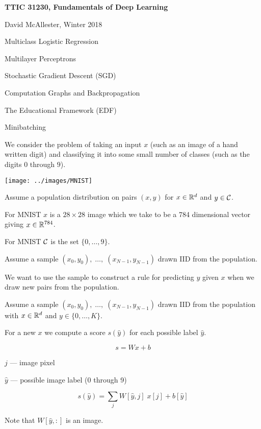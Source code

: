 {\Huge
  
  \centerline{\bf TTIC 31230, Fundamentals of Deep Learning}
  \bigskip
  \centerline{David McAllester, Winter 2018}
  \vfill
  \vfill
  \centerline{Multiclass Logistic Regression}
  \vfill
  \centerline{Multilayer Perceptrons}
  \vfill
  \centerline{Stochastic Gradient Descent (SGD)}
  \vfill
  \centerline{Computation Graphs and Backpropagation}
  \vfill
  \centerline{The Educational Framework (EDF)}
  \vfill
  \centerline{Minibatching}
  \vfill
  \vfill
  \vfill


We consider the problem of taking an input $x$ (such as an image of a hand written digit) and classifying it into some small number of classes (such as the digits $0$ through $9$).

\vfill
\centerline{\texttt{[image: ../images/MNIST]}}
  

Assume a population distribution on pairs $(x,y)$ for $x \in \mathbb{R}^d$ and $y \in {\cal C}$.

\vfill
For MNIST $x$ is a $28 \times 28$ image which we take to be a 784 dimensional vector giving $x \in \mathbb{R}^{784}$.

\vfill
For MNIST ${\cal C}$ is the set $\{0,\ldots,9\}$.

\vfill
Assume a sample $(x_0,y_0),\;\ldots,\;(x_{N-1},y_{N-1})$ drawn IID from the population.

\vfill
We want to use the sample to construct a rule for predicting $y$ given $x$ when we draw new pairs from the population.


Assume a sample $(x_0,y_0),\;\ldots,\;(x_{N-1},y_{N-1})$ drawn IID from the population with $x \in \mathbb{R}^d$ and $y \in \{0,\ldots,K\}$.

\vfill
For a new $x$ we compute a score $s(\hat{y})$ for each possible label $\hat{y}$.

\vfill
$$s = Wx + b$$


$j$ --- image pixel

\vfill
$\hat{y}$ --- possible image label (0 through 9)

\vfill
$$s(\hat{y}) = \sum_j W[\hat{y},j]\; x[j] + b[\hat{y}]$$

\vfill
Note that $W[\hat{y},:]$ is an image.

}
